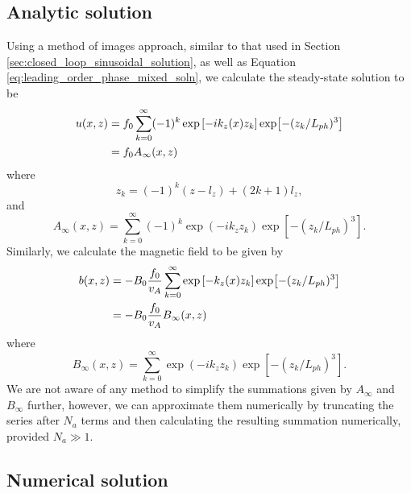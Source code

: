 \subsection{Analytic solution}

Using a method of images approach, similar to that used in Section \ref{sec:closed_loop_sinusoidal_solution}, as well as Equation \eqref{eq:leading_order_phase_mixed_soln}, we calculate the steady-state solution to be
\begin{equation}
    \label{eq:chap_3_closed_loop_phase_mix_soln_u}
    \begin{aligned}
    u(x,z) &= f_0\sum_{k=0}^\infty (-1)^k\exp\qty[-ik_z(x)z_k]\exp[-(z_k / L_{ph})^3] \\
    &= f_0A_\infty(x,z)
    \end{aligned}
\end{equation}
where
\begin{equation}
    z_k = (-1)^k (z-l_z) + (2k+1)l_z,
\end{equation}
and
\begin{equation}
    A_\infty(x,z) = \sum_{k=0}^\infty (-1)^k \exp(-ik_z z_k)\exp[-(z_k / L_{ph})^3].
\end{equation}
Similarly, we calculate the magnetic field to be given by
\begin{equation}
    \label{eq:chap_3_closed_loop_phase_mix_soln_b}
    \begin{aligned}
    b(x,z) &= -B_0\frac{f_0}{v_A}\sum_{k=0}^\infty \exp\qty[-k_z(x)z_k]\exp[-(z_k / L_{ph})^3] \\
    &= -B_0\frac{f_0}{v_A}B_\infty(x,z)
    \end{aligned}
\end{equation}
where
\begin{equation}
    B_\infty(x,z) = \sum_{k=0}^\infty \exp(-ik_z z_k)\exp[-(z_k / L_{ph})^3].
\end{equation}
We are not aware of any method to simplify the summations given by $A_\infty$ and $B_\infty$ further, however, we can approximate them numerically by truncating the series after $N_a$ terms and then calculating the resulting summation numerically, provided $N_a\gg 1$.

\subsection{Numerical solution}

